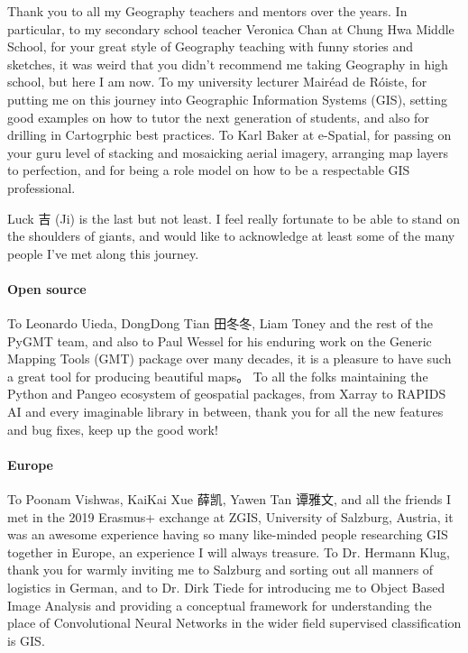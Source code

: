 \documentclass[12pt,twoside]{book}
\begin{document}
\begin{CJK*}{UTF8}{gbsn}
Thank you to all my Geography teachers and mentors over the years.
In particular, to my secondary school teacher Veronica Chan at Chung Hwa Middle School, for your great style of Geography teaching with funny stories and sketches, it was weird that you didn't recommend me taking Geography in high school, but here I am now.
To my university lecturer Mairéad de Róiste, for putting me on this journey into Geographic Information Systems (GIS), setting good examples on how to tutor the next generation of students, and also for drilling in Cartogrphic best practices.
To Karl Baker at e-Spatial, for passing on your guru level of stacking and mosaicking aerial imagery, arranging map layers to perfection, and for being a role model on how to be a respectable GIS professional.

Luck 吉 (Ji) is the last but not least.
I feel really fortunate to be able to stand on the shoulders of giants, and would like to acknowledge at least some of the many people I've met along this journey.

\paragraph{Open source}

To Leonardo Uieda, DongDong Tian 田冬冬, Liam Toney and the rest of the PyGMT team, and also to Paul Wessel for his enduring work on the Generic Mapping Tools (GMT) package over many decades, it is a pleasure to have such a great tool for producing beautiful maps。
To all the folks maintaining the Python and Pangeo ecosystem of geospatial packages, from Xarray to RAPIDS AI and every imaginable library in between, thank you for all the new features and bug fixes, keep up the good work!

\paragraph{Europe}

To Poonam Vishwas, KaiKai Xue 薛凯, Yawen Tan 谭雅文, and all the friends I met in the 2019 Erasmus+ exchange at ZGIS, University of Salzburg, Austria, it was an awesome experience having so many like-minded people researching GIS together in Europe, an experience I will always treasure.
To Dr. Hermann Klug, thank you for warmly inviting me to Salzburg and sorting out all manners of logistics in German, and to Dr. Dirk Tiede for introducing me to Object Based Image Analysis and providing a conceptual framework for understanding the place of Convolutional Neural Networks in the wider field supervised classification is GIS.


\end{CJK*}
\end{document}
